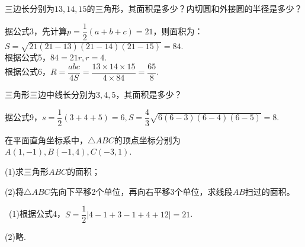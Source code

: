 \documentclass[10pt]{ctexart}
\newcommand{\jd}[1]{\noindent {\kaishu \textbf{解:}#1}}
\begin{document}
\begin{shaded}
\begin{example}
三边长分别为$13,14,15$的三角形，其面积是多少？内切圆和外接圆的半径是多少？
\end{example}
\end{shaded}
\jd 根据公式3，先计算$p=\dfrac{1}{2}(a+b+c)=21$，则面积为：$S=\sqrt{21(21-13)(21-14)(21-15)}=84$.\\
根据公式5，$84=21r,r=4$.\\
根据公式6，$R=\dfrac{abc}{4S}=\dfrac{13\times 14\times 15}{4\times 84}=\dfrac{65}{8}$.

\begin{shaded}
\begin{example}
三角形三边中线长分别为$3,4,5$，其面积是多少？
\end{example}
\end{shaded}
\jd 根据公式9，$s=\dfrac{1}{2}(3+4+5)=6,S=\dfrac{4}{3}\sqrt{6(6-3)(6-4)(6-5)}=8$.

\begin{shaded}
\begin{example}
在平面直角坐标系中，$\triangle ABC$的顶点坐标分别为$A(1,-1),B(-1,4),C(-3,1)$.

(1)求三角形$ABC$的面积；

(2)将$\triangle ABC$先向下平移2个单位，再向右平移3个单位，求线段$AB$扫过的面积。
\end{example}
\end{shaded}
\jd ~(1)根据公式4，$S=\dfrac{1}{2}\left|4-1+3-1+4+12\right|=21$.

    (2)略.
\end{document}
